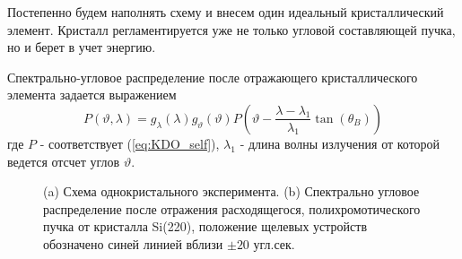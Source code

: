 \label{sec:single_crystal_section}
  Постепенно будем наполнять схему и внесем один идеальный кристаллический элемент.
  Кристалл регламентируется уже не только угловой составляющей пучка, но и берет в учет энергию.

  Спектрально-угловое распределение после отражающего кристаллического элемента задается выражением
  \begin{equation} \label{eq:monochromator_spectra}
    P(\vartheta,\lambda) = g_{\lambda}(\lambda)g_{\vartheta}(\vartheta) P(\vartheta - \frac{\lambda - \lambda_1}{\lambda_1}\tan(\theta_B))
   \end{equation}
где $P$ - соответствует (\ref{eq:KDO_self}), $\lambda_1$ - длина волны излучения от которой ведется отсчет углов $\vartheta$.
\begin{figure}[H]
  \centering
  \hfill

  \caption{(a) Схема однокристального эксперимента. (b) Спектрально угловое распределение после
   отражения расходящегося, полихромотического пучка от кристалла Si(220),
   положение щелевых устройств обозначено синей линией вблизи $\pm 20$ угл.сек.}
  \label{ris:single_crystal_schem_lamtet}
\end{figure}

